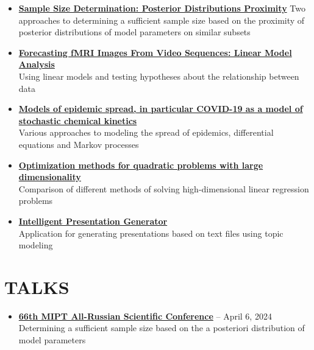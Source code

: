 \documentclass[11pt,a4paper]{moderncv}
\begin{document}
\begin{minipage}[t]{0.62\textwidth}
\begin{itemize}
\item \href{https://github.com/kisnikser/Posterior-Distributions-Proximity}{\textbf{Sample Size Determination: Posterior Distributions Proximity}}
Two approaches to determining a sufficient sample size based on the proximity of posterior distributions of model parameters on similar subsets
\item \href{https://github.com/DorinDaniil/Forecasting-fMRI-Images/tree/main}{\textbf{Forecasting fMRI Images From Video Sequences: Linear Model Analysis}}\\
Using linear models and testing hypotheses about the relationship between data
\item \href{https://github.com/kisnikser/Epidemic-Spread-Models}{\textbf{Models of epidemic spread, in particular COVID-19 as a model of stochastic chemical kinetics}}\\
Various approaches to modeling the spread of epidemics, differential equations and Markov processes
\item \href{https://github.com/kisnikser/Optimization-Methods}{\textbf{Optimization methods for quadratic problems with large dimensionality}}\\
Comparison of different methods of solving high-dimensional linear regression problems
\item \href{https://github.com/kisnikser/Intelligent-Presentation-Generator}{\textbf{Intelligent Presentation Generator}}\\
Application for generating presentations based on text files using topic modeling
\end{itemize}

\section{TALKS}

\begin{itemize}
\item \href{https://www.youtube.com/live/WnIRaRl730A?si=q0eScgnDP2ZidCpK&t=1723}{\textbf{66th MIPT All-Russian Scientific Conference}} -- April 6, 2024\\
Determining a sufficient sample size based on the a posteriori distribution of model parameters
\end{itemize}

\end{minipage}
\hfill
\end{document}
